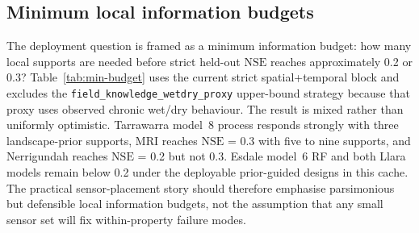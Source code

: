 \documentclass[11pt,a4paper]{article}
\newcommand{\nse}{\ensuremath{\mathrm{NSE}}}
\newcommand{\modelSix}{model~6 RF}
\newcommand{\modelEight}{model~8 process}
\begin{document}
\FloatBarrier

\subsection{Minimum local information budgets}\label{sec:stage2-minimum-budget}

The deployment question is framed as a minimum information budget: how many
local supports are needed before strict held-out \nse{} reaches approximately
0.2 or 0.3?  Table~\ref{tab:min-budget} uses the current strict
spatial+temporal block and excludes the
\texttt{field\_knowledge\_wetdry\_proxy} upper-bound strategy because that
proxy uses observed chronic wet/dry behaviour.  The result is mixed rather than
uniformly optimistic.  Tarrawarra \modelEight{} responds strongly with three
landscape-prior supports, MRI reaches \nse{} = 0.3 with five to nine supports,
and Nerrigundah reaches \nse{} = 0.2 but not 0.3.  Esdale \modelSix{} and both
Llara models remain below 0.2 under the deployable prior-guided designs in this
cache.  The practical sensor-placement story should therefore emphasise
parsimonious but defensible local information budgets, not the assumption that
any small sensor set will fix within-property failure modes.
\end{document}
